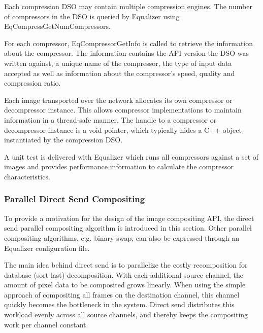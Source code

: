 \documentclass[10pt,a4]{scrartcl}
\begin{document}
Each compression DSO may contain multiple compression engines. The
number of compressors in the DSO is queried by Equalizer using
\textsf{EqCompressGetNumCompressors}. 

For each compressor, \textsf{EqCompressorGetInfo} is called to retrieve
the information about the compressor. The information contains the API
version the DSO was written against, a unique name of the compressor,
the type of input data accepted as well as information about the
compressor's speed, quality and compression ratio.

Each image transported over the network allocates its own compressor or
decompressor instance. This allows compressor implementations to
maintain information in a thread-safe manner. The handle to a compressor
or decompressor instance is a void pointer, which typically hides a C++
object instantiated by the compression DSO.

A unit test is delivered with Equalizer which runs all compressors
against a set of images and provides performance information to
calculate the compressor characteristics.



\subsubsection{\label{sDirectSend}Parallel Direct Send Compositing}

To provide a motivation for the design of the image compositing
API, the direct send parallel compositing algorithm is introduced in this
section. Other parallel compositing algorithms, e.g. binary-swap, can
also be expressed through an Equalizer configuration file.

The main idea behind direct send is to parallelize the costly
recomposition for database (sort-last) decomposition. With each
additional source channel, the amount of pixel data to be composited
grows linearly. When using the simple approach of compositing all frames
on the destination channel, this channel quickly becomes the bottleneck
in the system. Direct send distributes this workload evenly across all
source channels, and thereby keeps the compositing work per channel
constant.
\end{document}
